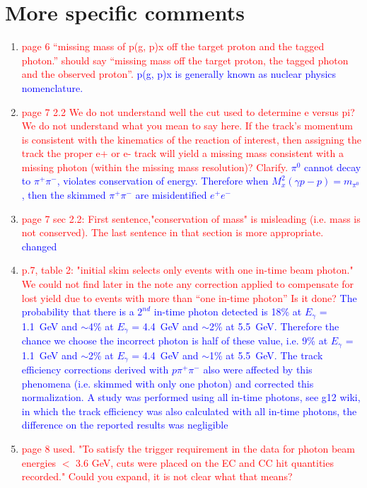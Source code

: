 \documentclass[11pt,a4paper]{article}
\begin{document}
\section*{More specific comments}
\begin{enumerate}
\item
\textcolor{red}{ page 6 ``missing mass of p(g, p)x off the target proton and the tagged photon.''
should say ``missing mass off the target proton, the tagged photon and the observed proton''.}
\textcolor{blue}{p(g, p)x is generally known as nuclear physics nomenclature.}
\item
\textcolor{red}{page 7 2.2 We do not understand well the cut used to determine e versus pi? We do not understand what you mean to say here. If the track's momentum is consistent with the kinematics of the reaction of interest, then assigning the track the proper e+ or e- track will yield a missing mass consistent with a missing photon (within the missing mass resolution)? Clarify.}
\textcolor{blue}{$\pi^0$ cannot decay to $\pi^+\pi^-$, violates conservation of energy. Therefore when $M_x^2(\gamma p - p) = m_{\pi^0}$, then the skimmed $\pi^+\pi^-$ are misidentified $e^+e^-$}
\item
\textcolor{red}{page 7 sec 2.2: First sentence,"conservation of mass" is misleading (i.e. mass is not conserved). The last sentence in that section is more appropriate.}
\textcolor{blue}{changed}
\item
\textcolor{red}{p.7, table 2: "initial skim selects only events with one in-time beam photon." We could not find later in the note any correction applied to compensate for lost yield due to events with more than ``one in-time photon'' Is it done?}
\textcolor{blue}{The probability that there is a $2^{nd}$ in-time photon detected is 18\% at $E_\gamma$ = 1.1~GeV and $\sim$4\% at $E_\gamma$ = 4.4~GeV and $\sim$2\% at 5.5~GeV. Therefore the chance we choose the incorrect photon is half of these value, i.e. 9\% at $E_\gamma$ = 1.1~GeV and $\sim$2\% at $E_\gamma$ = 4.4~GeV and $\sim$1\% at 5.5~GeV. The track efficiency corrections derived with $p\pi^+\pi^-$ also were affected by this phenomena (i.e. skimmed with only one photon) and corrected this normalization. A study was performed using all in-time photons, see g12 wiki, in which the track efficiency was also calculated with all in-time photons, the difference on the reported results was negligible}
\item
\textcolor{red}{page 8 used. "To satisfy the trigger requirement in the data for photon beam energies
$<$ 3.6 GeV, cuts were placed on the EC and CC hit quantities recorded." Could you expand, it is not clear what that means?}

\end{enumerate}
\end{document}
